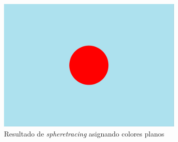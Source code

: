 \begin{figure}[ht!]
    \centering
    \includegraphics[width=0.8\textwidth]{Plantilla-TFG-master/img/escenaPlana.png}
    \caption{Resultado de \textit{spheretracing} asignando colores planos}
    \label{fig:planos}
\end{figure}
